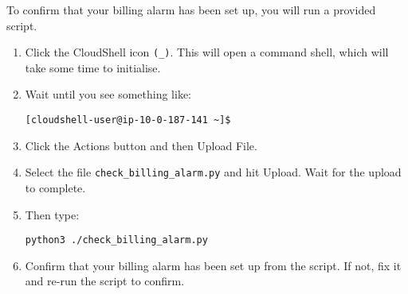 To confirm that your billing alarm has been set up, you will run a provided script.
\begin{enumerate}
\item Click the CloudShell icon \texttt{(\textrangle\_)}.
  This will open a command shell, which will take some time to initialise.

\item Wait until you see something like:
\begin{verbatim}
[cloudshell-user@ip-10-0-187-141 ~]$ 
\end{verbatim}

\item Click the Actions button and then Upload File.

\item Select the file \texttt{check\_billing\_alarm.py} and hit Upload.
  Wait for the upload to complete.

\item Then type:
\begin{verbatim}
python3 ./check_billing_alarm.py
\end{verbatim}

\item Confirm that your billing alarm has been set up from the script.
  If not, fix it and re-run the script to confirm. 

\end{enumerate}

